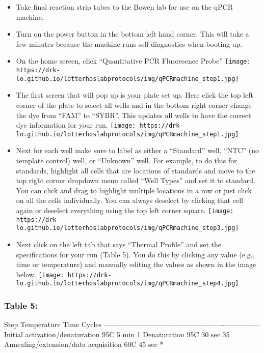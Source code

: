 \documentclass[
  letterpaper,
  DIV=11,
  numbers=noendperiod]{scrreprt}
\begin{document}
\begin{itemize}
\item
  Take final reaction strip tubes to the Bowen lab for use on the qPCR
  machine.
\item
  Turn on the power button in the bottom left hand corner. This will
  take a few minutes because the machine runs self diagnostics when
  booting up.
\item
  On the home screen, click ``Quantitative PCR Fluoresence Probe''
  \texttt{[image: https://drk-lo.github.io/lotterhoslabprotocols/img/qPCRmachine\_step1.jpg]}
\item
  The first screen that will pop up is your plate set up. Here click the
  top left corner of the plate to select all wells and in the bottom
  right corner change the dye from ``FAM'' to ``SYBR''. This updates all
  wells to have the correct dye information for your run.
  \texttt{[image: https://drk-lo.github.io/lotterhoslabprotocols/img/qPCRmachine\_step1.jpg]}
\item
  Next for each well make sure to label as either a ``Standard'' well,
  ``NTC'' (no template control) well, or ``Unknown'' well. For example,
  to do this for standards, highlight all cells that are locations of
  standards and move to the top right corner dropdown menu called ``Well
  Types'' and set it to standard. You can click and drag to highlight
  multiple locations in a row or just click on all the cells
  individually. You can always deselect by clicking that cell again or
  deselect everything using the top left corner square.
  \texttt{[image: https://drk-lo.github.io/lotterhoslabprotocols/img/qPCRmachine\_step3.jpg]}
\item
  Next click on the left tab that says ``Thermal Profile'' and set the
  specifications for your run (Table 5). You do this by clicking any
  value (e.g., time or temperature) and manually editing the values as
  shown in the image below.
  \texttt{[image: https://drk-lo.github.io/lotterhoslabprotocols/img/qPCRmachine\_step4.jpg]}
\end{itemize}

\hypertarget{table-5}{%
\subsubsection*{\texorpdfstring{\textbf{Table
5:}}{Table 5:}}\label{table-5}}

\textbar{} Step \textbar{} Temperature \textbar{} Time \textbar{} Cycles
\textbar{}
\textbar--------------------------------------\textbar-------------\textbar--------\textbar--------\textbar{}
\textbar{} Initial activation/denaturation \textbar{} 95C \textbar{} 5
min \textbar{} 1 \textbar{} \textbar{} Denaturation \textbar{} 95C
\textbar{} 30 sec \textbar{} 35 \textbar{} \textbar{}
Annealing/extension/data acquisition \textbar{} 60C \textbar{} 45 sec
\textbar{} * \textbar{}
\end{document}
